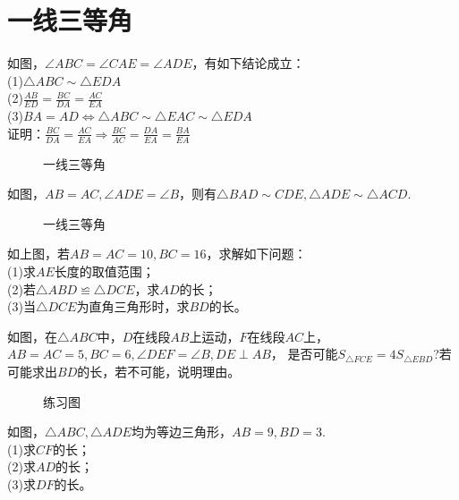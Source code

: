 \section{一线三等角}
\begin{definition}
    如图，$\angle ABC=\angle CAE=\angle ADE$，有如下结论成立：\\
    (1)$\triangle ABC\sim \triangle EDA$ \\
    (2)$\frac{AB}{ED}=\frac{BC}{DA}=\frac{AC}{EA}$ \\
    (3)$BA=AD \Leftrightarrow \triangle ABC \sim \triangle EAC \sim \triangle EDA$ \\
    证明：$\frac{BC}{DA}=\frac{AC}{EA}\Rightarrow \frac{BC}{AC}=\frac{DA}{EA}=\frac{BA}{EA}$
\end{definition}
\begin{figure}[H]
    \centering
    \resizebox{9cm}{!}{}
    \caption{一线三等角}
\end{figure}
\begin{definition}
    如图，$AB=AC,\angle ADE=\angle B$，则有$\triangle BAD \sim CDE,\triangle ADE \sim \triangle ACD.$
\end{definition}
\begin{figure}[H]
    \centering
    \resizebox{4cm}{!}{}
    \caption{一线三等角}
\end{figure}
\begin{problem}
如上图，若$AB=AC=10,BC=16$，求解如下问题：\\
(1)求$AE$长度的取值范围；\\
(2)若$\triangle ABD \backcong \triangle DCE$，求$AD$的长；\\
(3)当$\triangle DCE$为直角三角形时，求$BD$的长。
\end{problem}
\begin{problem}
如图，在$\triangle ABC$中，$D$在线段$AB$上运动，$F$在线段$AC$上，$AB=AC=5,BC=6,\angle DEF=\angle B,DE\perp AB$，
是否可能$S_{\triangle FCE}=4S_{\triangle EBD}$?若可能求出$BD$的长，若不可能，说明理由。
\end{problem}
\begin{figure}[H]
    \centering
    \resizebox{4cm}{!}{}
    \caption{练习图}
\end{figure}
\begin{problem}
如图，$\triangle ABC,\triangle ADE$均为等边三角形，$AB=9,BD=3$. \\
(1)求$CF$的长；\\
(2)求$AD$的长；\\
(3)求$DF$的长。\\
\end{problem}
